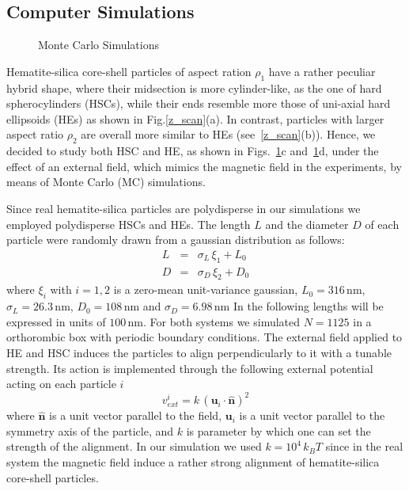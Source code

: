 \documentclass[aps,prl,preprint,superscriptaddress]{revtex4-1} %
\def\nm{\,\si{\nano\meter}}%
\begin{document}
\subsection{Computer Simulations}
\begin{figure}[ht]
\caption{Monte Carlo Simulations}\label{fig:sim}
\end{figure}
Hematite-silica core-shell particles of aspect ration $\rho_1$
have a rather peculiar hybrid shape, where their midsection is more cylinder-like, as the one of hard spherocylinders 
(HSCs), while their ends resemble more those of uni-axial hard ellipsoids (HEs) as shown in Fig.\ref{z_scan}(a).
In contrast, particles with larger aspect ratio $\rho_2$ are overall more similar to HEs (see~\ref{z_scan}(b)).
Hence, we decided to study both HSC and HE, as shown in Figs.~\ref{fig:sim}c and~\ref{fig:sim}d, under the effect of an external
field, which mimics the magnetic field in the experiments, by means of Monte Carlo (MC) simulations.

Since real hematite-silica particles are polydisperse in our simulations we employed polydisperse HSCs and HEs.
The length $L$ and the diameter $D$ of each particle were randomly drawn from a gaussian distribution as follows:
\begin{eqnarray}
  L &=& \sigma_L\,\xi_1 + L_0\\
  D &=& \sigma_D\,\xi_2 + D_0
\end{eqnarray}
where $\xi_i$ with $i=1,2$ is a zero-mean unit-variance gaussian, $L_0=316 \nm$, $\sigma_L=26.3 \nm$, $D_0=108 \nm$ and $\sigma_D=6.98 \nm$
In the following lengths will be expressed in units of $100\nm$. 
For both systems we simulated $N=1125$ in a orthorombic box with periodic boundary conditions.
The external field applied to HE and HSC induces the particles to align perpendicularly to it with a tunable strength.
Its action is implemented through the following external potential acting on each particle $i$
\begin{equation}
v_{ext}^i = k\, {( \mathbf{u}_i\cdot \hat{\mathbf{n}} )}^2
\end{equation}
where $\hat{\mathbf{n}}$ is a unit vector parallel to the field, $\mathbf{u}_i$ is a unit vector parallel to the symmetry axis of the particle,
and $k$ is parameter by which one can set the strength of the alignment. In our simulation we used $k=10^4\, k_B T$ since in the real
system the magnetic field induce a rather strong alignment of hematite-silica core-shell particles. 
\end{document}
